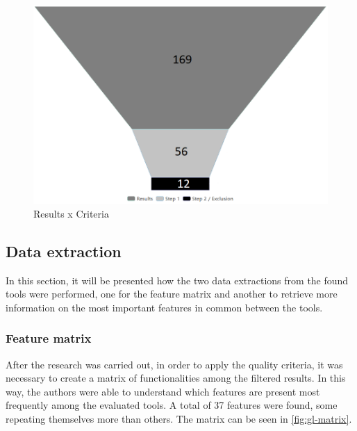 

\begin{figure}[htb]
  \caption{Results x Criteria}\label{fig:gl-results-criteria}
  \begin{center}
    \includegraphics[width=16cm]{img/gl-results.png}
  \end{center}
\end{figure}

\subsection{Data extraction}\label{sec:gl-data-extraction}

In this section, it will be presented how the two data extractions from the found tools were performed, one for the feature matrix and another to retrieve more information on the most important features in common between the tools.

\subsubsection{Feature matrix}\label{sec:gl-feature-matrix}

After the research was carried out, in order to apply the quality criteria, it was necessary to create a matrix of functionalities among the filtered results. In this way, the authors were able to understand which features are present most frequently among the evaluated tools. A total of 37 features were found, some repeating themselves more than others. The matrix can be seen in \autoref{fig:gl-matrix}.

